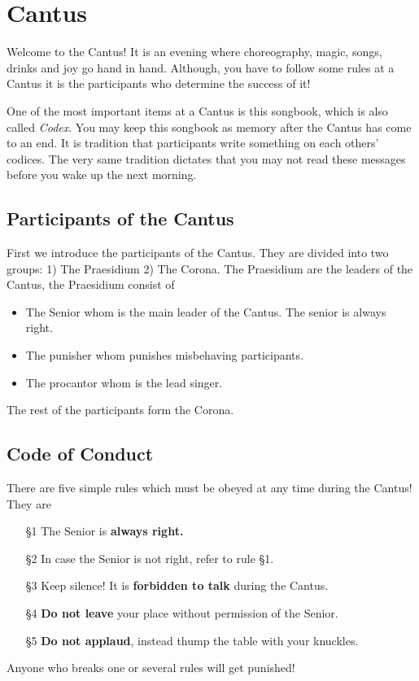 \section{Cantus}
Welcome to the Cantus!
It is an evening where choreography, magic, songs, drinks and joy go hand in hand.
Although, you have to follow some rules at a Cantus it is the participants who determine the success of it!

One of the most important items at a Cantus is this songbook, which is also called \emph{Codex}.
You may keep this songbook as memory after the Cantus has come to an end.
It is tradition that participants write something on each others' codices. 
The very same tradition dictates that you may not read these messages before you wake up the next morning.

\subsection{Participants of the Cantus}
First we introduce the participants of the Cantus.
They are divided into two groups: 1) The Praesidium 2) The Corona.
The Praesidium are the leaders of the Cantus, the Praesidium consist of
\begin{itemize}
        \item The Senior whom is the main leader of the Cantus. The senior is always right.
        \item The punisher whom punishes misbehaving participants.
        \item The procantor whom is the lead singer.
\end{itemize}
The rest of the participants form the Corona.

\subsection{Code of Conduct}
There are five simple rules which must be obeyed at any time during the Cantus!
They are
\begin{itemize}
        \item[§1] The Senior is \textbf{always right.}
        \item[§2] In case the Senior is not right, refer to rule §1.
        \item[§3] Keep silence! It is \textbf{forbidden to talk} during the Cantus.
        \item[§4] \textbf{Do not leave} your place without permission of the Senior.
        \item[§5] \textbf{Do not applaud}, instead thump the table with your knuckles.
\end{itemize}
Anyone who breaks one or several rules will get punished!

